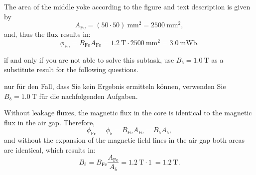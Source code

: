 \begin{solutionblock}
    The area of the middle yoke according to the figure and text description is given by
    $$
        A_{\mathrm{Fe}} = (50\cdot 50)\SI{}{\milli\metre^2} = \SI{2500}{\milli\metre^2},
    $$
    and, thus the flux results in:
    $$
        \phi_{\mathrm{Fe}} = B_{\mathrm{Fe}} A_{\mathrm{Fe}} = \SI{1.2}{\tesla} \cdot \SI{2500}{\milli\metre^2} = \SI{3.0}{\milli\weber}.
    $$
\end{solutionblock}



\begin{hintblock}
    if and only if you are not able to solve this subtask, use $B_{\updelta} = \SI{1.0}{\tesla}$ as a substitute result for the following questions.
\end{hintblock}



\begin{germanhintblock}
    nur für den Fall, dass Sie kein Ergebnis ermitteln können, verwenden Sie $B_{\updelta} = \SI{1.0}{\tesla}$ für die nachfolgenden Aufgaben.
\end{germanhintblock}


\begin{solutionblock}
    Without leakage fluxes, the magnetic flux in the core is identical to the magnetic flux in the air gap. Therefore,
    $$
        \phi_{\mathrm{Fe}} = \phi_{\updelta} = B_{\mathrm{Fe}} A_{\mathrm{Fe}} = B_{\updelta} A_{\updelta},
    $$
    and without the expansion of the magnetic field lines in the air gap both areas are identical, which results in:
    $$
        B_{\updelta} = B_{\mathrm{Fe}} \frac{A_{\mathrm{Fe}}}{A_{\updelta}} = \SI{1.2}{\tesla} \cdot \SI{1}{} = \SI{1.2}{\tesla}.
    $$

\end{solutionblock}


